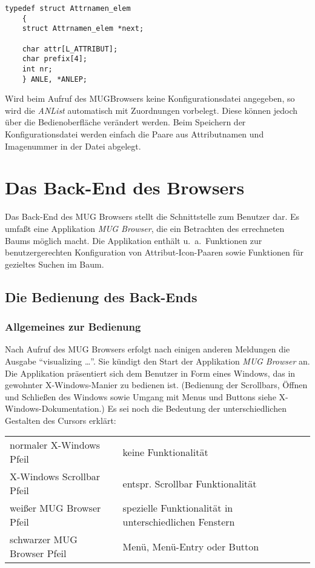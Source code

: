 \begin{small}
\begin{verbatim}
typedef struct Attrnamen_elem
    {
    struct Attrnamen_elem *next;

    char attr[L_ATTRIBUT];
    char prefix[4];
    int nr;
    } ANLE, *ANLEP;
\end{verbatim}
\end{small}

Wird beim Aufruf des MUGBrowsers keine Konfigurationsdatei angegeben, so wird die {\it ANList} automatisch mit Zuordnungen vorbelegt. Diese k\"onnen jedoch
\"uber die Bedienoberfl\"ache ver\"andert werden. Beim Speichern der Konfigurationsdatei werden einfach die Paare aus Attributnamen und Imagenummer in der
Datei abgelegt.

\chapter{Das Back-End des Browsers}

Das Back-End des MUG Browsers stellt die Schnittstelle zum Benutzer dar. Es umfa\ss{}t eine Applikation {\it MUG Browser}, die ein Betrachten des
errechneten Baums m\"oglich macht. Die Applikation enth\"alt u.~a.\ Funktionen zur benutzergerechten Konfiguration von Attribut-Icon-Paaren sowie
Funktionen f\"ur gezieltes Suchen im Baum.

\section{Die Bedienung des Back-Ends}

\subsection{Allgemeines zur Bedienung}

Nach Aufruf des MUG Browsers erfolgt nach einigen anderen Meldungen die Ausgabe "`visualizing \ldots"'. Sie k\"undigt den Start der Applikation {\it MUG
Browser} an. Die Applikation pr\"asentiert sich dem Benutzer in Form eines Windows, das in gewohnter X-Windows-Manier zu bedienen ist. (Bedienung der
Scrollbars, \"Offnen und Schlie\ss{}en des Windows sowie Umgang mit Menus und Buttons siehe X-Windows-Dokumentation.) Es sei noch die Bedeutung der
unterschiedlichen Gestalten des Cursors erkl\"art:

\bigskip
\begin{tabular}{|l|p{6.9cm}|}
\hline
normaler X-Windows Pfeil     &   keine Funktionalit\"at  \\
X-Windows Scrollbar Pfeil    &   entspr. Scrollbar Funktionalit\"at   \\
wei\ss{}er MUG Browser Pfeil   &   spezielle Funktionalit\"at in unterschiedlichen Fenstern  \\
schwarzer MUG Browser Pfeil  &   Men\"u, Men\"u-Entry oder Button     \\
\hline
\end{tabular}
\bigskip


